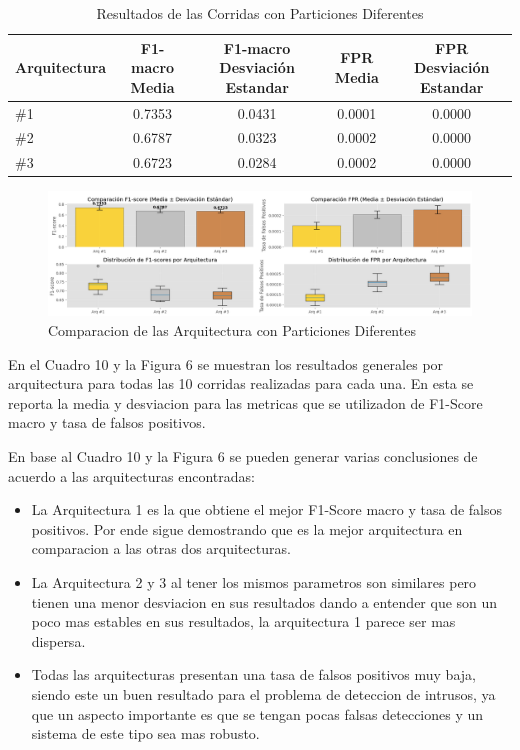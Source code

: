 \documentclass[12pt,a4paper]{article}
\begin{document}
\begin{table}[ht]
  \centering
  \tiny
  \begin{tabular}{lcccc}
    \hline
    Arquitectura & F1-macro Media & F1-macro Desviación Estandar & FPR Media & FPR Desviación Estandar \\
    \hline
    \#1 & 0.7353 & 0.0431 & 0.0001 & 0.0000 \\
    \#2 & 0.6787 & 0.0323 & 0.0002 & 0.0000 \\
    \#3 & 0.6723 & 0.0284 & 0.0002 & 0.0000 \\
    \hline
  \end{tabular}
  \caption{Resultados de las Corridas con Particiones Diferentes}
  \label{tab:corridas_part_dt}
\end{table}

\begin{figure}[H]
  \centering
  \includegraphics[width=1\textwidth]{../img/ComparacionPartArqui.png}
  \caption{Comparacion de las Arquitectura con Particiones Diferentes}\label{fig:partition-architectures-decision-tree}
\end{figure}

En el Cuadro 10 y la Figura 6 se muestran los resultados generales por arquitectura para todas las 10 corridas realizadas para cada una.
En esta se reporta la media y desviacion para las metricas que se utilizadon de F1-Score macro y tasa de falsos positivos.

En base al Cuadro 10 y la Figura 6 se pueden generar varias conclusiones de acuerdo a las arquitecturas encontradas:

\begin{itemize}
  \item La Arquitectura 1 es la que obtiene el mejor F1-Score macro y tasa de falsos positivos. Por ende
    sigue demostrando que es la mejor arquitectura en comparacion a las otras dos arquitecturas.
  \item La Arquitectura 2 y 3 al tener los mismos parametros son similares pero tienen una menor desviacion en sus resultados
    dando a entender que son un poco mas estables en sus resultados, la arquitectura 1 parece ser mas dispersa.
  \item Todas las arquitecturas presentan una tasa de falsos positivos muy baja, siendo este un buen resultado
    para el problema de deteccion de intrusos, ya que un aspecto importante es que se tengan pocas falsas detecciones
    y un sistema de este tipo sea mas robusto.
\end{itemize}
\end{document}
